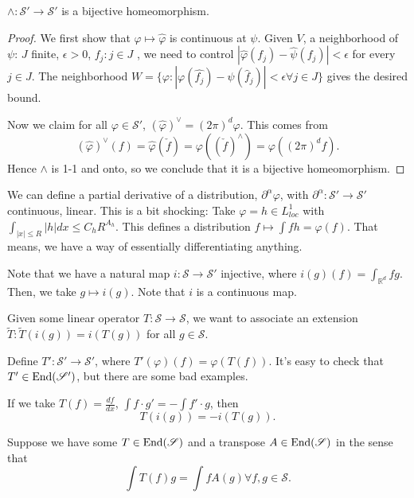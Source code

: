 \documentclass[11pt]{scrartcl}
\newcommand{\R}{\mathbb{R}}
\let \phi \varphi
\let \hat \widehat
\newcommand{\<}{\langle}
\renewcommand{\>}{\rangle}
\begin{document}
\begin{thm} $\wedge: \mathscr S' \rightarrow \mathscr S'$ is a bijective homeomorphism.  
\end{thm}
\begin{proof}
We first show that $\phi \mapsto \hat{\phi}$ is continuous at $\psi$.  
Given $V$, a neighborhood of $\psi$: $J$ finite, $\epsilon > 0$, $f_j : j \in J$
, we need to control $|\hat{\phi}(f_j) - \hat{\psi}(f_j)| < \epsilon$ for every $j \in J$.
The neighborhood $W = \{\phi: |\phi(\hat{f_j}) - \psi(\hat{f}_j)| < \epsilon \forall j \in J\}$ gives the desired bound.

Now we claim for all $\phi \in \mathscr S'$, $(\hat{\phi})^{\vee} = (2\pi)^d \phi$.  This comes from
$$(\hat{\phi})^{\vee} (f) = \hat{\phi}(\check{f}) = \phi((\check{f})^{\wedge}) = \phi((2\pi)^d f).$$
Hence $\wedge$ is 1-1 and onto, so we conclude that it is a bijective homeomorphism.
\end{proof}
We can define a partial derivative of a distribution, $\partial^\alpha \phi$, with $\partial^\alpha: \mathscr S' \rightarrow \mathscr S'$ continuous, linear.  This is a bit shocking:  Take $\phi = h \in L_{loc}^1$ with $\int_{|x| \le R}|h|dx \le C_h R^{A_h}$.  This defines a distribution $f \mapsto \int fh = \phi(f)$.  That means, we have a way of essentially differentiating anything.

Note that we have a natural map $i : \mathscr S \rightarrow \mathscr S'$ injective, where $i(g)(f) = \int_{\R^d} f g$.  Then, we take $g \mapsto i(g)$.  Note that $i$ is a continuous map.

Given some linear operator $T : \mathscr S \rightarrow \mathscr S$, we want to associate an extension $\tilde{T}: \tilde{T}(i(g)) = i(T(g))$ for all $g \in \mathscr S$.  

Define $T':\mathscr S' \rightarrow \mathscr S'$, where $T'(\phi)(f) = \phi(T(f))$.  It's easy to check that $T' \in \operatorname{End}(\mathscr S')$, but there are some bad examples.
\begin{example}  If we take $T(f) = \frac{df}{dx}$, $\int f \cdot g' = - \int f' \cdot g$, then 
$$T(i(g)) = -i(T(g)).$$
\end{example}
Suppose we have some $T \in \operatorname{End}(\mathscr S)$ and a transpose $A \in \operatorname{End}(\mathscr S)$ in the sense that 
$$\int T(f)g = \int f A(g) \forall f, g \in \mathscr S.$$
\end{document}
